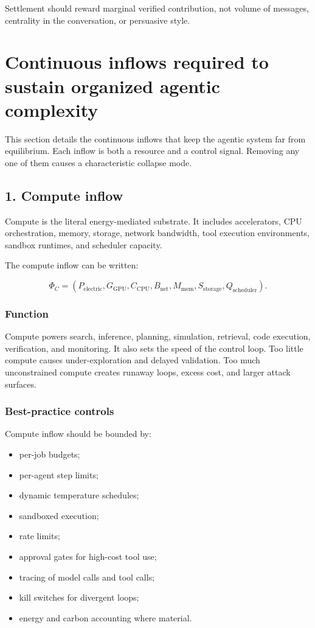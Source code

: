 \documentclass[11pt]{article}
\providecommand{\tightlist}{\setlength{\itemsep}{0pt}\setlength{\parskip}{0pt}}
\begin{document}
Settlement should reward marginal verified contribution, not volume of messages, centrality in the conversation, or persuasive style.

\section{Continuous inflows required to sustain organized agentic complexity}\label{continuous-inflows-required-to-sustain-organized-agentic-complexity}

This section details the continuous inflows that keep the agentic system far from equilibrium. Each inflow is both a resource and a control signal. Removing any one of them causes a characteristic collapse mode.

\subsection{1. Compute inflow}\label{compute-inflow}

Compute is the literal energy-mediated substrate. It includes accelerators, CPU orchestration, memory, storage, network bandwidth, tool execution environments, sandbox runtimes, and scheduler capacity.

The compute inflow can be written:

\[
\Phi_C=(P_{\text{electric}},G_{\text{GPU}},C_{\text{CPU}},B_{\text{net}},M_{\text{mem}},S_{\text{storage}},Q_{\text{scheduler}}).
\]

\subsubsection{Function}\label{function}

Compute powers search, inference, planning, simulation, retrieval, code execution, verification, and monitoring. It also sets the speed of the control loop. Too little compute causes under-exploration and delayed validation. Too much unconstrained compute creates runaway loops, excess cost, and larger attack surfaces.

\subsubsection{Best-practice controls}\label{best-practice-controls}

Compute inflow should be bounded by:

\begin{itemize}
\tightlist
\item
  per-job budgets;
\item
  per-agent step limits;
\item
  dynamic temperature schedules;
\item
  sandboxed execution;
\item
  rate limits;
\item
  approval gates for high-cost tool use;
\item
  tracing of model calls and tool calls;
\item
  kill switches for divergent loops;
\item
  energy and carbon accounting where material.
\end{itemize}
\end{document}
